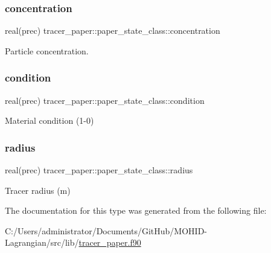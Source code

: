 \subsubsection{\texorpdfstring{concentration}{concentration}}
{\footnotesize\ttfamily real(prec) tracer\+\_\+paper\+::paper\+\_\+state\+\_\+class\+::concentration\hspace{0.3cm}{\ttfamily [private]}}



Particle concentration. 

\mbox{\label{structtracer__paper_1_1paper__state__class_a1e2ac1d6419a5ec39dd8529f8cd83112}} 
\subsubsection{\texorpdfstring{condition}{condition}}
{\footnotesize\ttfamily real(prec) tracer\+\_\+paper\+::paper\+\_\+state\+\_\+class\+::condition\hspace{0.3cm}{\ttfamily [private]}}



Material condition (1-\/0) 

\mbox{\label{structtracer__paper_1_1paper__state__class_a931d90e457142607c7e1079b99f72298}} 
\subsubsection{\texorpdfstring{radius}{radius}}
{\footnotesize\ttfamily real(prec) tracer\+\_\+paper\+::paper\+\_\+state\+\_\+class\+::radius\hspace{0.3cm}{\ttfamily [private]}}



Tracer radius (m) 



The documentation for this type was generated from the following file\+:\begin{DoxyCompactItemize}
\item 
C\+:/\+Users/administrator/\+Documents/\+Git\+Hub/\+M\+O\+H\+I\+D-\/\+Lagrangian/src/lib/\mbox{\hyperlink{tracer__paper_8f90}{tracer\+\_\+paper.\+f90}}\end{DoxyCompactItemize}
